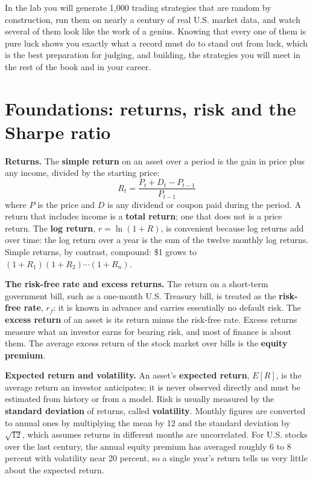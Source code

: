 In the lab you will generate 1,000 trading strategies that are random by construction, run them on nearly a century of real U.S. market data, and watch several of them look like the work of a genius. Knowing that every one of them is pure luck shows you exactly what a record must do to stand out from luck, which is the best preparation for judging, and building, the strategies you will meet in the rest of the book and in your career.

\section{Foundations: returns, risk and the Sharpe ratio}
\label{sec:01-foundations}

\textbf{Returns.} The \textbf{simple return} on an asset over a period is the gain in price plus any income, divided by the starting price:
\begin{equation}
  R_t = \frac{P_t + D_t - P_{t-1}}{P_{t-1}}
  \label{eq:01-return}
\end{equation}
where $P$ is the price and $D$ is any dividend or coupon paid during the period. A return that includes income is a \textbf{total return}; one that does not is a price return. The \textbf{log return}, $r = \ln(1 + R)$, is convenient because log returns add over time: the log return over a year is the sum of the twelve monthly log returns. Simple returns, by contrast, compound: \$1 grows to $(1 + R_1)(1 + R_2)\cdots(1 + R_n)$.

\textbf{The risk-free rate and excess returns.} The return on a short-term government bill, such as a one-month U.S. Treasury bill, is treated as the \textbf{risk-free rate}, $r_f$: it is known in advance and carries essentially no default risk. The \textbf{excess return} of an asset is its return minus the risk-free rate. Excess returns measure what an investor earns for bearing risk, and most of finance is about them. The average excess return of the stock market over bills is the \textbf{equity premium}.

\textbf{Expected return and volatility.} An asset's \textbf{expected return}, $E[R]$, is the average return an investor anticipates; it is never observed directly and must be estimated from history or from a model. Risk is usually measured by the \textbf{standard deviation} of returns, called \textbf{volatility}. Monthly figures are converted to annual ones by multiplying the mean by 12 and the standard deviation by $\sqrt{12}$, which assumes returns in different months are uncorrelated. For U.S. stocks over the last century, the annual equity premium has averaged roughly 6 to 8 percent with volatility near 20 percent, so a single year's return tells us very little about the expected return.

